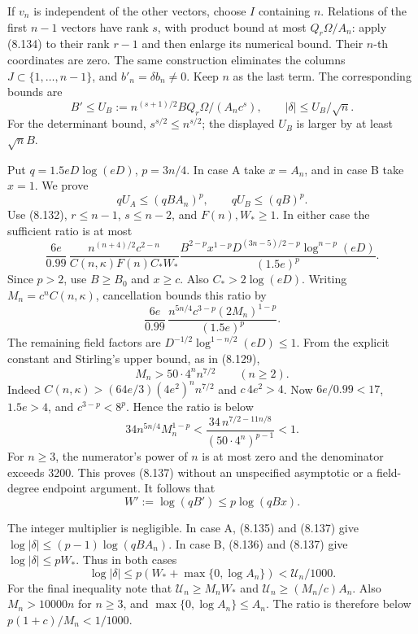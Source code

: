 \documentclass[
  11pt,
  a4paper,
]{article}
\begin{document}
If \(v_n\) is independent of the other vectors, choose \(I\) containing
\(n\). Relations of the first \(n-1\) vectors have rank \(s\), with
product bound at most \(Q_r\Omega/A_n\): apply (8.134) to their rank
\(r-1\) and then enlarge its numerical bound. Their \(n\)-th coordinates
are zero. The same construction eliminates the columns \(J\subset
\{1,\ldots,n-1\}\), and \(b'_n=\delta b_n\ne0\). Keep \(n\) as the last
term. The corresponding bounds are \[
B'\le U_B:=n^{(s+1)/2}BQ_r\Omega/(A_nc^s),\qquad
|\delta|\le U_B/\sqrt n.
\tag{8.136}
\] For the determinant bound, \(s^{s/2}\le n^{s/2}\); the displayed
\(U_B\) is larger by at least \(\sqrt n B\).

Put \(q=1.5eD\log(eD)\), \(p=3n/4\). In case A take \(x=A_n\), and in
case B take \(x=1\). We prove \[
qU_A\le(qBA_n)^p,\qquad qU_B\le(qB)^p.
\tag{8.137}
\] Use (8.132), \(r\le n-1\), \(s\le n-2\), and \(F(n),W_*\ge1\). In
either case the sufficient ratio is at most \[
\frac{6e}{0.99}\,
\frac{n^{(n+4)/2}c^{2-n}}{C(n,\kappa)F(n)C_*W_*}
\frac{B^{2-p}x^{1-p}
D^{(3n-5)/2-p}\log^{n-p}(eD)}
{(1.5e)^p}.
\] Since \(p>2\), use \(B\ge B_0\) and \(x\ge c\). Also
\(C_*>2\log(eD)\). Writing \(M_n=c^nC(n,\kappa)\), cancellation bounds
this ratio by \[
\frac{6e}{0.99}\,
\frac{n^{5n/4}c^{3-p}(2M_n)^{1-p}}
{(1.5e)^p}.
\] The remaining field factors are \(D^{-1/2}\log^{1-n/2}(eD)\le1\).
From the explicit constant and Stirling's upper bound, as in (8.129), \[
M_n>50\cdot4^n n^{7/2}\qquad(n\ge2).
\] Indeed \(C(n,\kappa)>(64e/3)(4e^2)^nn^{7/2}\) and \(c\,4e^2>4\). Now
\(6e/0.99<17\), \(1.5e>4\), and \(c^{3-p}<8^p\). Hence the ratio is
below \[
34n^{5n/4}M_n^{1-p}
<
\frac{34\,n^{7/2-11n/8}}
{(50\cdot4^n)^{p-1}}<1.
\] For \(n\ge3\), the numerator's power of \(n\) is at most zero and the
denominator exceeds 3200. This proves (8.137) without an unspecified
asymptotic or a field-degree endpoint argument. It follows that \[
W':=\log(qB')\le p\log(qBx).
\tag{8.138}
\]

The integer multiplier is negligible. In case A, (8.135) and (8.137)
give \(\log|\delta|\le(p-1)\log(qBA_n)\). In case B, (8.136) and (8.137)
give \(\log|\delta|\le pW_*\). Thus in both cases \[
\log|\delta|\le p(W_*+\max\{0,\log A_n\})
<\mathcal U_n/1000.
\tag{8.139}
\] For the final inequality note that \(\mathcal U_n\ge M_nW_*\) and
\(\mathcal U_n\ge(M_n/c)A_n\). Also \(M_n>10000n\) for \(n\ge3\), and
\(\max\{0,\log A_n\}\le A_n\). The ratio is therefore below
\(p(1+c)/M_n<1/1000\).
\end{document}
